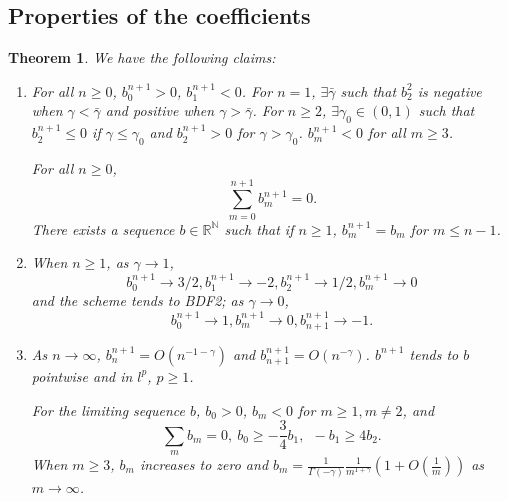 \documentclass[11pt]{article}
\newtheorem{thm}{Theorem}
\begin{document}
\subsection{Properties of the coefficients}
\begin{thm}
We have the following claims:
\begin{enumerate}
\item For all $n\ge 0$, $b_0^{n+1}>0$, $b_1^{n+1}<0$. For $n=1$, $\exists \bar{\gamma}$ such that $b_2^2$ is negative when $\gamma<\bar{\gamma}$ and positive when $\gamma>\bar{\gamma}$. For $n\ge 2$, $\exists\gamma_0\in (0,1)$ such that $b_2^{n+1}\le 0$ if $\gamma\le \gamma_0$ and $b_2^{n+1}>0$ for $\gamma>\gamma_0$. $b_m^{n+1}<0$ for all $m\ge 3$. 

For all $n\ge 0$, $$
\sum_{m=0}^{n+1}b_m^{n+1}=0.
$$ 
There exists a sequence $b\in \mathbb{R}^{\mathbb{N}}$ such that if $n\ge 1$, $b_m^{n+1}=b_m$ for $m\le n-1$.

\item 
When $n\ge 1$, as $\gamma\to 1$, $$
b_0^{n+1}\to 3/2, b_1^{n+1}\to -2, b_2^{n+1}\to 1/2, b_m^{n+1}\to 0
$$
and the scheme tends to BDF2; as $\gamma\to 0$, $$
b_0^{n+1}\to 1, b_m^{n+1}\to 0 ,b_{n+1}^{n+1}\to -1.
$$
\item As $n\to \infty$, $b_n^{n+1}=O(n^{-1-\gamma})$ and $b_{n+1}^{n+1}=O(n^{-\gamma})$. $b^{n+1}$ tends to
$b$ pointwise and in $l^p$, $p\ge 1$. 

For the limiting sequence $b$, $b_0>0$, $b_m<0$
for $m\ge 1, m\neq 2$, and $$
\sum_m b_m=0,\ 
b_0\ge -\frac{3}{4}b_1,\ \ -b_1\ge 4b_2.
$$
When $m\ge 3$, $b_m$ increases to zero and $b_m=\frac{1}{\Gamma(-\gamma)}\frac{1}{m^{1+\gamma}}\left(1+O(\frac{1}{m})\right)$ as $m\to\infty$.
\end{enumerate}
\end{thm}
\end{document}
